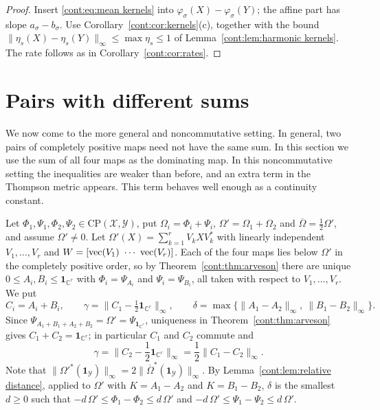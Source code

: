\begin{proof}
Insert \eqref{cont:eq:mean kernels} into $\varphi_\sigma(X)-\varphi_\sigma(Y)$; the affine part has slope $a_\sigma-b_\sigma$. Use Corollary~\ref{cont:cor:kernels}(c), together with the bound $\|\eta_s(X)-\eta_s(Y)\|_\infty\leq\max\eta_s\leq1$ of Lemma~\ref{cont:lem:harmonic kernels}. The rate follows as in Corollary~\ref{cont:cor:rates}.
\end{proof}
 

\section{Pairs with different sums}\label{cont:sec:different sums}
We now come to the more general and noncommutative setting. In general, two pairs of completely positive maps need not have the same sum. In this section we use the sum of all four maps as the dominating map. In this noncommutative setting the inequalities are weaker than before, and an extra term in the Thompson metric appears. This term behaves well enough as a continuity constant.

Let $\Phi_1,\Psi_1,\Phi_2,\Psi_2\in\mathrm{CP}(\mathcal{X},\mathcal{Y})$, put $\Omega_i=\Phi_i+\Psi_i$, $\Omega'=\Omega_1+\Omega_2$ and $\overline{\Omega}=\frac12\Omega'$, and assume $\Omega'\neq0$. Let $\Omega'(X)=\sum_{k=1}^rV_kXV_k^*$ with linearly independent $V_1,\dots,V_r$ and $W=[\vectorise(V_1)\ \cdots\ \vectorise(V_r)]$. Each of the four maps lies below $\Omega'$ in the completely positive order, so by Theorem~\ref{cont:thm:arveson} there are unique $0\leq A_i,B_i\leq\mathbf{1}_{\mathbb{C}^r}$ with $\Phi_i=\Psi_{A_i}$ and $\Psi_i=\Psi_{B_i}$, all taken with respect to $V_1,\dots,V_r$. We put
\[
C_i=A_i+B_i,\qquad\gamma=\|C_1-\tfrac12\mathbf{1}_{\mathbb{C}^r}\|_\infty,\qquad\delta=\max\big\{\|A_1-A_2\|_\infty,\ \|B_1-B_2\|_\infty\big\}.
\]
Since $\Psi_{A_1+B_1+A_2+B_2}=\Omega'=\Psi_{\mathbf{1}_{\mathbb{C}^r}}$, uniqueness in Theorem~\ref{cont:thm:arveson} gives $C_1+C_2=\mathbf{1}_{\mathbb{C}^r}$; in particular $C_1$ and $C_2$ commute and
\[
\gamma=\|C_2-\frac12\mathbf{1}_{\mathbb{C}^r}\|_\infty=\frac12\|C_1-C_2\|_\infty.
\]
Note that $\|\Omega'^*(\mathbf{1}_{\mathcal{Y}})\|_\infty=2\|\overline{\Omega}^*(\mathbf{1}_{\mathcal{Y}})\|_\infty$. By Lemma~\ref{cont:lem:relative distance}, applied to $\Omega'$ with $K=A_1-A_2$ and $K=B_1-B_2$, $\delta$ is the smallest $d\geq0$ such that $-d\,\Omega'\leq\Phi_1-\Phi_2\leq d\,\Omega'$ and $-d\,\Omega'\leq\Psi_1-\Psi_2\leq d\,\Omega'$.

